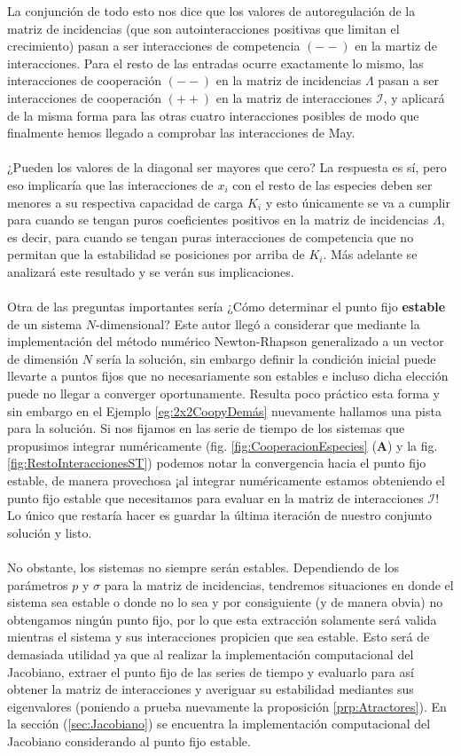 La conjunción de todo esto nos dice que los valores de autoregulación de la matriz de incidencias (que son autointeracciones positivas que limitan el crecimiento) pasan a ser interacciones de competencia $(--)$ en la martiz de interacciones. Para el resto de las entradas ocurre exactamente lo mismo, las interacciones de cooperación $(--)$ en la matriz de incidencias $\Lambda$ pasan a ser interacciones de cooperación $(++)$ en la matriz de interacciones $\mathcal{I}$, y aplicará de la misma forma para las otras cuatro interacciones posibles de modo que finalmente hemos llegado a comprobar las interacciones de May.\\
\\
¿Pueden los valores de la diagonal ser mayores que cero? La respuesta es sí, pero eso implicaría que las interacciones de $x_i$ con el resto de las especies deben ser menores a su respectiva capacidad de carga $K_i$ y esto únicamente se va a cumplir para cuando se tengan puros coeficientes positivos en la matriz de incidencias $\Lambda$, es decir, para cuando se tengan puras interacciones de competencia que no permitan que la estabilidad se posiciones por arriba de $K_i$. Más adelante se analizará este resultado y se verán sus implicaciones.\\
\\
Otra de las preguntas importantes sería ¿Cómo determinar el punto fijo \textbf{estable} de un sistema $N$-dimensional? Este autor llegó a considerar que mediante la implementación del método numérico Newton-Rhapson generalizado a un vector de dimensión $N$ sería la solución, sin embargo definir la condición inicial puede llevarte a puntos fijos que no necesariamente son estables e incluso dicha elección puede no llegar a converger oportunamente. Resulta poco práctico esta forma y sin embargo en el Ejemplo \ref{eg:2x2CoopyDemás} nuevamente hallamos una pista para la solución. Si nos fijamos en las serie de tiempo de los sistemas que propusimos integrar numéricamente (fig. \ref{fig:CooperacionEspecies} (\textbf{A}) y la fig. \ref{fig:RestoInteraccionesST}) podemos notar la convergencia hacia el punto fijo estable, de manera provechosa ¡al integrar numéricamente estamos obteniendo el punto fijo estable que necesitamos para evaluar en la matriz de interacciones $\mathcal{I}$! Lo único que restaría hacer es guardar la última iteración de nuestro conjunto solución y listo.\\
\\
No obstante, los sistemas no siempre serán estables. Dependiendo de los parámetros $p$ y $\sigma$ para la matriz de incidencias, tendremos situaciones en donde el sistema sea estable o donde no lo sea y por consiguiente (y de manera obvia) no obtengamos ningún punto fijo, por lo que esta extracción solamente será valida mientras el sistema y sus interacciones propicien que sea estable. Esto será de demasiada utilidad ya que al realizar la implementación computacional del Jacobiano, extraer el punto fijo de las series de tiempo y evaluarlo para así obtener la matriz de interacciones y averiguar su estabilidad mediantes sus eigenvalores (poniendo a prueba nuevamente la proposición \ref{prp:Atractores}). En la sección (\ref{sec:Jacobiano}) se encuentra la implementación computacional del Jacobiano considerando al punto fijo estable.

